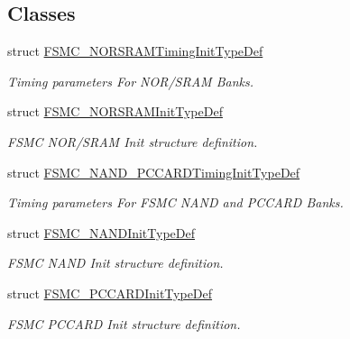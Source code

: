 \subsection*{Classes}
\begin{DoxyCompactItemize}
\item 
struct \hyperlink{struct_f_s_m_c___n_o_r_s_r_a_m_timing_init_type_def}{F\+S\+M\+C\+\_\+\+N\+O\+R\+S\+R\+A\+M\+Timing\+Init\+Type\+Def}
\begin{DoxyCompactList}\small\item\em Timing parameters For N\+O\+R/\+S\+R\+AM Banks. \end{DoxyCompactList}\item 
struct \hyperlink{struct_f_s_m_c___n_o_r_s_r_a_m_init_type_def}{F\+S\+M\+C\+\_\+\+N\+O\+R\+S\+R\+A\+M\+Init\+Type\+Def}
\begin{DoxyCompactList}\small\item\em F\+S\+MC N\+O\+R/\+S\+R\+AM Init structure definition. \end{DoxyCompactList}\item 
struct \hyperlink{struct_f_s_m_c___n_a_n_d___p_c_c_a_r_d_timing_init_type_def}{F\+S\+M\+C\+\_\+\+N\+A\+N\+D\+\_\+\+P\+C\+C\+A\+R\+D\+Timing\+Init\+Type\+Def}
\begin{DoxyCompactList}\small\item\em Timing parameters For F\+S\+MC N\+A\+ND and P\+C\+C\+A\+RD Banks. \end{DoxyCompactList}\item 
struct \hyperlink{struct_f_s_m_c___n_a_n_d_init_type_def}{F\+S\+M\+C\+\_\+\+N\+A\+N\+D\+Init\+Type\+Def}
\begin{DoxyCompactList}\small\item\em F\+S\+MC N\+A\+ND Init structure definition. \end{DoxyCompactList}\item 
struct \hyperlink{struct_f_s_m_c___p_c_c_a_r_d_init_type_def}{F\+S\+M\+C\+\_\+\+P\+C\+C\+A\+R\+D\+Init\+Type\+Def}
\begin{DoxyCompactList}\small\item\em F\+S\+MC P\+C\+C\+A\+RD Init structure definition. \end{DoxyCompactList}\end{DoxyCompactItemize}
